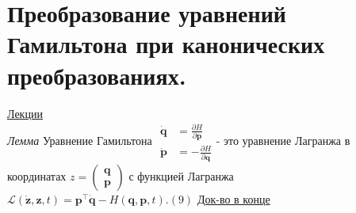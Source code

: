 \documentclass[specialist, subf, href, colorlinks=true, 12pt, times, mtpro, final]{disser}
\theoremstyle{definition}
\begin{document}
    \section{Преобразование уравнений Гамильтона при канонических преобразованиях.}
     \label{18}
    \hyperlink {lects.27}{Лекции} \\
\emph{Лемма} Уравнение Гамильтона $\left.
\begin{matrix}
\dot{\mathbf{q}} &= \frac{\partial H}{\partial \mathbf{p}}\\
\dot{\mathbf{p}} &= -\frac{\partial H}{\partial \mathbf{q}}
\end{matrix}
\right.
$- это уравнение Лагранжа в координатах $z = 
\left (
\begin{matrix}
\mathbf{q} \\ \mathbf{p}
\end{matrix}
\right )
$ с функцией Лагранжа $\mathcal{L}(\dot{\mathbf{z}},\mathbf{z}, t) = \mathbf{p}^\top \dot{\mathbf{q}} - H(\mathbf{q},\mathbf{p}, t).(9)$ \hyperlink {lects.27}{Док-во в конце}
\end{document}
